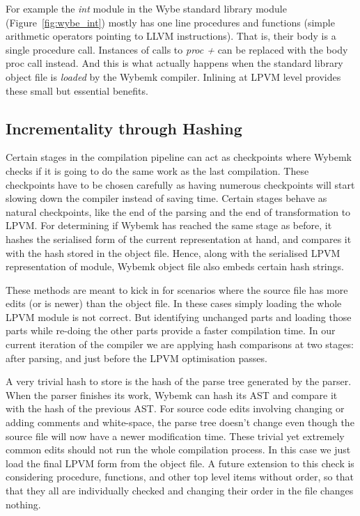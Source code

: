 For example the \textit{int} module in the Wybe standard library module
(Figure~\ref{fig:wybe_int}) mostly has one line procedures and functions
(simple arithmetic operators pointing to LLVM instructions). That is, their
body is a single procedure call. Instances of calls to \textit{proc +} can be
replaced with the body proc call instead. And this is what actually happens
when the standard library object file is \textit{loaded} by the Wybemk
compiler. Inlining at LPVM level provides these small but essential benefits.


\subsection{Incrementality through Hashing}

Certain stages in the compilation pipeline can act as checkpoints where Wybemk
checks if it is going to do the same work as the last compilation. These
checkpoints have to be chosen carefully as having numerous checkpoints will
start slowing down the compiler instead of saving time. Certain stages behave
as natural checkpoints, like the end of the parsing and the end of
transformation to LPVM. For determining if Wybemk has reached the same stage as
before, it hashes the serialised form of the current representation at hand,
and compares it with the hash stored in the object file. Hence, along with the
serialised LPVM representation of module, Wybemk object file also embeds
certain hash strings. 

These methods are meant to kick in for scenarios where the source file has more
edits (or is newer) than the object file. In these cases simply loading the
whole LPVM module is not correct. But identifying unchanged parts and loading
those parts while re-doing the other parts provide a faster compilation
time. In our current iteration of the compiler we are applying hash comparisons
at two stages: after parsing, and just before the LPVM optimisation passes.

A very trivial hash to store is the hash of the parse tree generated by the
parser. When the parser finishes its work, Wybemk can hash its AST and compare
it with the hash of the previous AST. For source code edits involving changing
or adding comments and white-space, the parse tree doesn't change even though
the source file will now have a newer modification time. These trivial yet
extremely common edits should not run the whole compilation process. In this
case we just load the final LPVM form from the object file. A future extension
to this check is considering procedure, functions, and other top level items
without order, so that that they all are individually checked and changing
their order in the file changes nothing.

